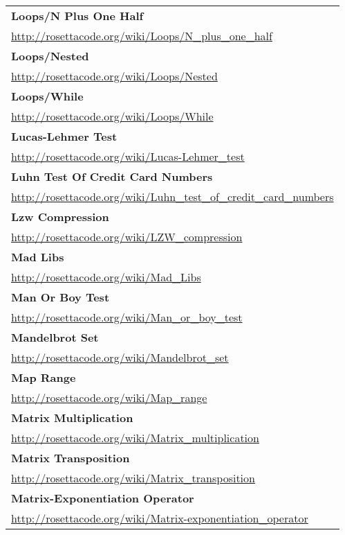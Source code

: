 \begin{longtable}{l}
\textbf{Loops/N Plus One Half } \\ \href{http://rosettacode.org/wiki/Loops/N\_plus\_one\_half}{http://rosettacode.org/wiki/Loops/N\_plus\_one\_half} \\
\textbf{Loops/Nested } \\ \href{http://rosettacode.org/wiki/Loops/Nested}{http://rosettacode.org/wiki/Loops/Nested} \\
\textbf{Loops/While } \\ \href{http://rosettacode.org/wiki/Loops/While}{http://rosettacode.org/wiki/Loops/While} \\
\textbf{
Lucas-Lehmer Test } \\ \href{http://rosettacode.org/wiki/Lucas-Lehmer\_test}{http://rosettacode.org/wiki/Lucas-Lehmer\_test} \\
\textbf{Luhn Test Of Credit Card Numbers } \\ \href{http://rosettacode.org/wiki/Luhn\_test\_of\_credit\_card\_numbers}{http://rosettacode.org/wiki/Luhn\_test\_of\_credit\_card\_numbers} \\
\textbf{
Lzw Compression } \\ \href{http://rosettacode.org/wiki/LZW\_compression}{http://rosettacode.org/wiki/LZW\_compression} \\
\textbf{Mad Libs } \\ \href{http://rosettacode.org/wiki/Mad\_Libs}{http://rosettacode.org/wiki/Mad\_Libs} \\
\textbf{Man Or Boy Test } \\ \href{http://rosettacode.org/wiki/Man\_or\_boy\_test}{http://rosettacode.org/wiki/Man\_or\_boy\_test} \\
\textbf{Mandelbrot Set } \\ \href{http://rosettacode.org/wiki/Mandelbrot\_set}{http://rosettacode.org/wiki/Mandelbrot\_set} \\
\textbf{
Map Range } \\ \href{http://rosettacode.org/wiki/Map\_range}{http://rosettacode.org/wiki/Map\_range} \\
\textbf{Matrix Multiplication } \\ \href{http://rosettacode.org/wiki/Matrix\_multiplication}{http://rosettacode.org/wiki/Matrix\_multiplication} \\
\textbf{Matrix Transposition } \\ \href{http://rosettacode.org/wiki/Matrix\_transposition}{http://rosettacode.org/wiki/Matrix\_transposition} \\
\textbf{
Matrix-Exponentiation Operator } \\ \href{http://rosettacode.org/wiki/Matrix-exponentiation\_operator}{http://rosettacode.org/wiki/Matrix-exponentiation\_operator} \\

\end{longtable}
